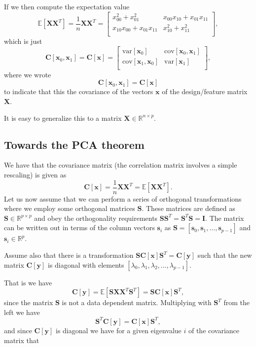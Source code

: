 \documentclass[%
oneside,                 %
final,                   %
10pt]{article}
\begin{document}
If we then compute the expectation value
\[
\mathbb{E}[\bm{X}\bm{X}^T] = \frac{1}{n}\bm{X}\bm{X}^T=\begin{bmatrix}
x_{00}^2+x_{01}^2 & x_{00}x_{10}+x_{01}x_{11}\\
x_{10}x_{00}+x_{01}x_{11} & x_{10}^2+x_{11}^2\\
\end{bmatrix},
\]
which is just 
\[
\bm{C}[\bm{x}_0,\bm{x}_1] = \bm{C}[\bm{x}]=\begin{bmatrix} \mathrm{var}[\bm{x}_0] & \mathrm{cov}[\bm{x}_0,\bm{x}_1] \\
                              \mathrm{cov}[\bm{x}_1,\bm{x}_0] & \mathrm{var}[\bm{x}_1] \\
             \end{bmatrix},
\]
where we wrote $$\bm{C}[\bm{x}_0,\bm{x}_1] = \bm{C}[\bm{x}]$$ to indicate that this the covariance of the vectors $\bm{x}$ of the design/feature matrix $\bm{X}$.

It is easy to generalize this to a matrix $\bm{X}\in {\mathbb{R}}^{n\times p}$.


\subsection*{Towards the PCA theorem}

We have that the covariance matrix (the correlation matrix involves a simple rescaling) is given as
\[
\bm{C}[\bm{x}] = \frac{1}{n}\bm{X}\bm{X}^T= \mathbb{E}[\bm{X}\bm{X}^T].
\]
Let us now assume that we can perform a series of orthogonal transformations where we employ some orthogonal matrices $\bm{S}$.
These matrices are defined as $\bm{S}\in {\mathbb{R}}^{p\times p}$ and obey the orthogonality requirements $\bm{S}\bm{S}^T=\bm{S}^T\bm{S}=\bm{I}$. The matrix can be written out in terms of the column vectors $\bm{s}_i$ as $\bm{S}=[\bm{s}_0,\bm{s}_1,\dots,\bm{s}_{p-1}]$ and $\bm{s}_i \in {\mathbb{R}}^{p}$.

Assume also that there is a transformation $\bm{S}\bm{C}[\bm{x}]\bm{S}^T=\bm{C}[\bm{y}]$ such that the new matrix $\bm{C}[\bm{y}]$ is diagonal with elements $[\lambda_0,\lambda_1,\lambda_2,\dots,\lambda_{p-1}]$.  

That is we have
\[
\bm{C}[\bm{y}] = \mathbb{E}[\bm{S}\bm{X}\bm{X}^T\bm{S}^T]=\bm{S}\bm{C}[\bm{x}]\bm{S}^T,
\]
since the matrix $\bm{S}$ is not a data dependent matrix.   Multiplying with $\bm{S}^T$ from the left we have
\[
\bm{S}^T\bm{C}[\bm{y}] = \bm{C}[\bm{x}]\bm{S}^T,
\]
and since $\bm{C}[\bm{y}]$ is diagonal we have for a given eigenvalue $i$ of the covariance matrix that
\end{document}
